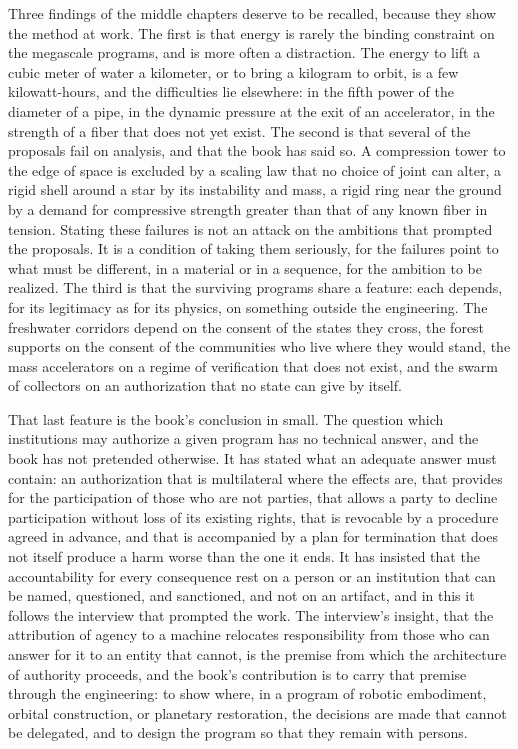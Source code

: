 Three findings of the middle chapters deserve to be recalled, because they show the method at work. The first is that energy is rarely the binding constraint on the megascale programs, and is more often a distraction. The energy to lift a cubic meter of water a kilometer, or to bring a kilogram to orbit, is a few kilowatt-hours, and the difficulties lie elsewhere: in the fifth power of the diameter of a pipe, in the dynamic pressure at the exit of an accelerator, in the strength of a fiber that does not yet exist. The second is that several of the proposals fail on analysis, and that the book has said so. A compression tower to the edge of space is excluded by a scaling law that no choice of joint can alter, a rigid shell around a star by its instability and mass, a rigid ring near the ground by a demand for compressive strength greater than that of any known fiber in tension. Stating these failures is not an attack on the ambitions that prompted the proposals. It is a condition of taking them seriously, for the failures point to what must be different, in a material or in a sequence, for the ambition to be realized. The third is that the surviving programs share a feature: each depends, for its legitimacy as for its physics, on something outside the engineering. The freshwater corridors depend on the consent of the states they cross, the forest supports on the consent of the communities who live where they would stand, the mass accelerators on a regime of verification that does not exist, and the swarm of collectors on an authorization that no state can give by itself.

That last feature is the book's conclusion in small. The question which institutions may authorize a given program has no technical answer, and the book has not pretended otherwise. It has stated what an adequate answer must contain: an authorization that is multilateral where the effects are, that provides for the participation of those who are not parties, that allows a party to decline participation without loss of its existing rights, that is revocable by a procedure agreed in advance, and that is accompanied by a plan for termination that does not itself produce a harm worse than the one it ends. It has insisted that the accountability for every consequence rest on a person or an institution that can be named, questioned, and sanctioned, and not on an artifact, and in this it follows the interview that prompted the work. The interview's insight, that the attribution of agency to a machine relocates responsibility from those who can answer for it to an entity that cannot, is the premise from which the architecture of authority proceeds, and the book's contribution is to carry that premise through the engineering: to show where, in a program of robotic embodiment, orbital construction, or planetary restoration, the decisions are made that cannot be delegated, and to design the program so that they remain with persons.

